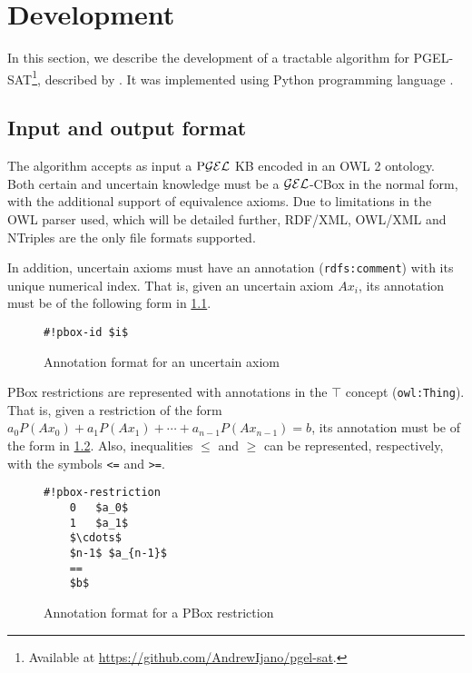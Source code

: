 
\chapter{Development}
\label{cap:development}

In this section, we describe the development of a tractable algorithm for PGEL-SAT\footnote{Available at \url{https://github.com/AndrewIjano/pgel-sat}.}, described by \citet{Fin2020}. It was implemented using Python programming language \citep{python3}.

\section{Input and output format}

The algorithm accepts as input a $\text{P}\mathcal{GEL}$ KB encoded in an OWL 2 ontology. Both certain and uncertain knowledge must be a $\mathcal{GEL}$-CBox in the normal form, with the additional support of equivalence axioms. Due to limitations in the OWL parser used, which will be detailed further, RDF/XML, OWL/XML and NTriples are the only file formats supported.

In addition, uncertain axioms must have an annotation (\texttt{rdfs:comment}) with its unique numerical index. That is, given an uncertain axiom $Ax_i$, its annotation must be of the following form in \cref{fig:annot-axiom}.
\begin{figure}
	\centering
	\begin{minipage}{6cm}
		\begin{lstlisting}[style=mystyle]
      #!pbox-id $i$
    \end{lstlisting}
	\end{minipage}
	\caption{Annotation format for an uncertain axiom}
	\label{fig:annot-axiom}
\end{figure}

PBox restrictions are represented with annotations in the $\top$ concept (\texttt{owl:Thing}). That is, given a restriction of the form $a_0 P(Ax_0) + a_1P(Ax_1) + \cdots + a_{n-1} P(Ax_{n-1}) = b$, its annotation must be of the form in \cref{fig:pbox-rest}.  Also, inequalities $\leq$ and $\geq$ can be represented, respectively, with the symbols \texttt{<=} and \texttt{>=}.

\begin{figure}
	\centering
	\begin{minipage}{6cm}
		\begin{lstlisting}[style=mystyle]
    #!pbox-restriction
    0   $a_0$
    1   $a_1$
    $\cdots$
    $n-1$ $a_{n-1}$
    ==
    $b$
    \end{lstlisting}
	\end{minipage}
	\caption{Annotation format for a PBox restriction}
	\label{fig:pbox-rest}
\end{figure}


